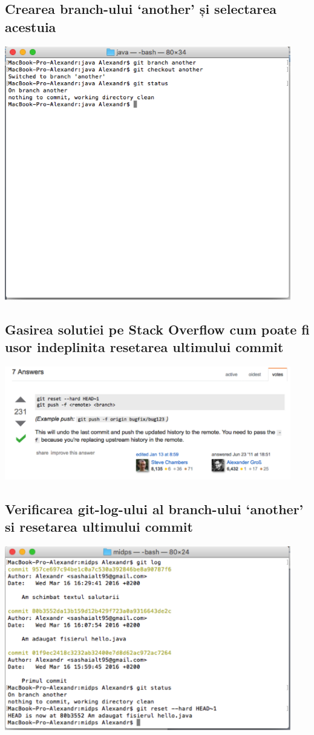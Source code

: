 \documentclass[12pt]{article}
\begin{document}
\subsection{Crearea branch-ului ‘another’ și selectarea acestuia}
\includegraphics[width=12.5cm]{images/17}
\subsection{Gasirea solutiei pe Stack Overflow cum poate fi usor indeplinita resetarea ultimului commit}
\includegraphics[width=12.5cm]{images/18}
\subsection{Verificarea git-log-ului al branch-ului ‘another’ si resetarea ultimului commit}
\includegraphics[width=12.5cm]{images/19}
\end{document}
